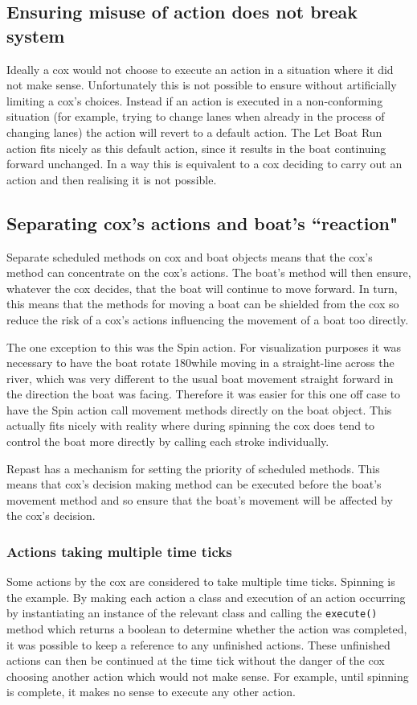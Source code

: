     \subsection{Ensuring misuse of action does not break system}
      Ideally a cox would not choose to execute an action in a situation where it did not make sense. Unfortunately this is not possible to ensure without artificially limiting a cox's choices. Instead if an action is executed in a non-conforming situation (for example, trying to change lanes when already in the process of changing lanes) the action will revert to a default action. The Let Boat Run action fits nicely as this default action, since it results in the boat continuing forward unchanged. In a way this is equivalent to a cox deciding to carry out an action and then realising it is not possible.

    \subsection{Separating cox's actions and boat's ``reaction"}
    Separate scheduled methods on cox and boat objects means that the cox's method can concentrate on the cox's actions. The boat's method will then ensure, whatever the cox decides, that the boat will continue to move forward. In turn, this means that the methods for moving a boat can be shielded from the cox so reduce the risk of a cox's actions influencing the movement of a boat too directly. 
    
    The one exception to this was the Spin action. For visualization purposes it was necessary to have the boat rotate 180\textdegree while moving in a straight-line across the river, which was very different to the usual boat movement straight forward in the direction the boat was facing. Therefore it was easier for this one off case to have the Spin action call movement methods directly on the boat object. This actually fits nicely with reality where during spinning the cox does tend to control the boat more directly by calling each stroke individually.

      Repast has a mechanism for setting the priority of scheduled methods. This means that cox's decision making method can be executed before the boat's movement method and so ensure that the boat's movement will be affected by the cox's decision.

      \subsubsection{Actions taking multiple time ticks}
      Some actions by the cox are considered to take multiple time ticks. Spinning is the example. By making each action a class and execution of an action occurring by instantiating an instance of the relevant class and calling the \texttt{execute()} method which returns a boolean to determine whether the action was completed, it was possible to keep a reference to any unfinished actions. These unfinished actions can then be continued at the time tick without the danger of the cox choosing another action which would not make sense. For example, until spinning is complete, it makes no sense to execute any other action.
  
